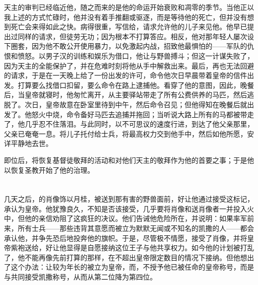 天主的审判已经临近他，随之而来的是他的命运开始衰败和凋零的季节。当他正以我上述的方式忙碌时，他并没有着手推翻或驱逐，而是等待他的死亡，但并没有想到死亡会来得如此之快。病得很重，写信给，请求允许他的儿子来见他。他早已提出过同样的请求，但徒劳无功；因为根本不打算答应。相反，他对那年轻人屡次设下圈套，因为他不敢公开使用暴力，以免激起内战，招致他最惧怕的——军队的仇恨和愤怒。以男子汉的训练和娱乐为借口，他让与野兽搏斗；但这一计谋失败了，因为天主的全能保护了，并在危难时刻将他从手中解救出来。最后，再也无法回避的请求，于是在一天晚上给了一份出发的许可，命令他次日早晨带着皇帝的信件出发。打算要么找借口扣留，要么命令在路上逮捕他。看穿了他的意图，因此，晚餐后，当皇帝就寝时，他匆忙离开，从主要驿站带走了所有公费供养的马匹，然后逃脱了。次日，皇帝故意在卧室里待到中午，然后命令召见；但他得知在晚餐后就出发了。他怒火中烧，命令备好马匹去追捕并拖回；当听说大路上所有的马都被带走了，他几乎忍不住落泪。与此同时，以不可思议的速度行进，到达了他父亲那里，父亲已奄奄一息。将儿子托付给士兵，将最高权力交到他手中，然后如他所愿，安详平静地去世。\par

即位后，将恢复基督徒敬拜的活动和对他们天主的敬拜作为他的首要之事；于是他以恢复圣教开始了他的治理。\par


\section{}

几天之后，的肖像饰以月桂，被送到那有害的野兽面前，好让他通过接受这标记，承认为皇帝。他犹豫良久，不知是否该接受，几乎要将肖像和送肖像者一并投入火中，但他的亲信劝阻了这疯狂的决议。他们告诫他危险所在，并说明：如果率军前来，所有士兵——那些违背其意愿而被立为默默无闻或不知名的凯撒的人——都会承认他，并争先恐后地投奔他的旗帜。于是，尽管极不情愿，接受了肖像，并将皇帝紫袍送给，好让他显得是自愿接纳这位王子与他共享权力。如今他的计划被打乱了，他不能再像先前打算的那样，在不超出皇帝限定数目的情况下接纳。但他想出了这个办法：让较为年长的被立为皇帝，而，不授予他已被任命的皇帝称号，而是与共同接受凯撒称号，从而从第二位降为第四位。\par

